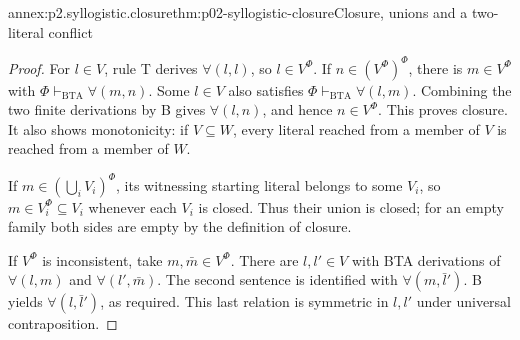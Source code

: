 \begin{annexitem}{annex:p2.syllogistic.closure}{thm:p02-syllogistic-closure}{Closure, unions and a two-literal conflict}
\begin{proof}
For \(l\in V\), rule T derives \(\forall(l,l)\), so \(l\in V^\Phi\).
If \(n\in(V^\Phi)^\Phi\), there is \(m\in V^\Phi\) with
\(\Phi\vdash_{\mathrm{BTA}}\forall(m,n)\). Some \(l\in V\) also
satisfies \(\Phi\vdash_{\mathrm{BTA}}\forall(l,m)\). Combining the two
finite derivations by B gives \(\forall(l,n)\), and hence \(n\in V^\Phi\).
This proves closure. It also shows monotonicity: if \(V\subseteq W\), every
literal reached from a member of \(V\) is reached from a member of \(W\).

If \(m\in(\bigcup_i V_i)^\Phi\), its witnessing starting literal belongs
to some \(V_i\), so \(m\in V_i^\Phi\subseteq V_i\) whenever each \(V_i\)
is closed. Thus their union is closed; for an empty family both sides are
empty by the definition of closure.

If \(V^\Phi\) is inconsistent, take \(m,\bar m\in V^\Phi\). There are
\(l,l'\in V\) with BTA derivations of \(\forall(l,m)\) and
\(\forall(l',\bar m)\). The second sentence is identified with
\(\forall(m,\bar l')\). B yields \(\forall(l,\bar l')\), as required.
This last relation is symmetric in \(l,l'\) under universal contraposition.
\end{proof}
\end{annexitem}

